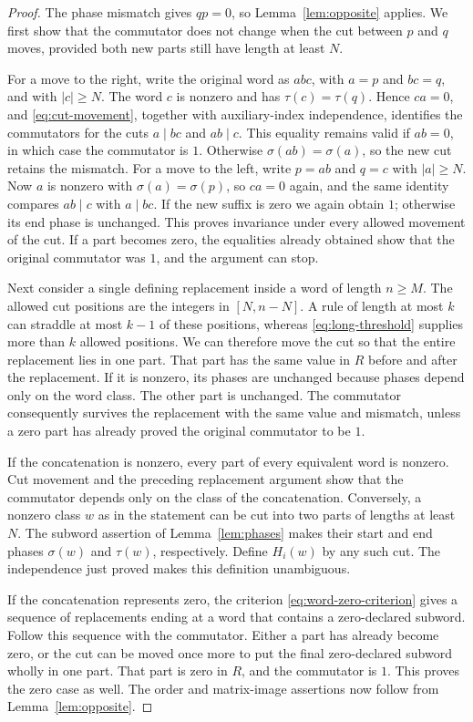 \begin{proof}
The phase mismatch gives $qp=0$, so
Lemma~\ref{lem:opposite} applies. We first show that the commutator
does not change when the cut between $p$ and $q$ moves, provided both
new parts still have length at least $N$.

For a move to the right, write the original word as $abc$, with
$a=p$ and $bc=q$, and with $|c|\ge N$. The word $c$ is nonzero and
has $\tau(c)=\tau(q)$. Hence $ca=0$, and
\eqref{eq:cut-movement}, together with auxiliary-index independence,
identifies the commutators for the cuts $a\mid bc$ and $ab\mid c$.
This equality remains valid if $ab=0$, in which case the commutator
is $1$. Otherwise $\sigma(ab)=\sigma(a)$, so the new cut retains
the mismatch. For a move to the left, write $p=ab$ and $q=c$ with
$|a|\ge N$. Now $a$ is nonzero with $\sigma(a)=\sigma(p)$, so
$ca=0$ again, and the same identity compares $ab\mid c$ with
$a\mid bc$. If the new suffix is zero we again obtain $1$;
otherwise its end phase is unchanged. This proves invariance under
every allowed movement of the cut. If a part becomes zero, the
equalities already obtained show that the original commutator was
$1$, and the argument can stop.

Next consider a single defining replacement inside a word of length
$n\ge M$. The allowed cut positions are the integers in $[N,n-N]$.
A rule of length at most $k$ can straddle at most $k-1$ of these
positions, whereas \eqref{eq:long-threshold} supplies more than $k$
allowed positions. We can therefore move the cut so that the entire
replacement lies in one part. That part has the same value in $R$
before and after the replacement. If it is nonzero, its phases are
unchanged because phases depend only on the word class. The other
part is unchanged. The commutator consequently survives the
replacement with the same value and mismatch, unless a zero part has
already proved the original commutator to be $1$.

If the concatenation is nonzero, every part of every equivalent word
is nonzero. Cut movement and the preceding replacement argument show
that the commutator depends only on the class of the concatenation.
Conversely, a nonzero class $w$ as in the statement can be cut into
two parts of lengths at least $N$. The subword assertion of
Lemma~\ref{lem:phases} makes their start and end phases
$\sigma(w)$ and $\tau(w)$, respectively. Define $H_i(w)$ by any
such cut. The independence just proved makes this definition
unambiguous.

If the concatenation represents zero, the criterion
\eqref{eq:word-zero-criterion} gives a sequence of replacements
ending at a word that contains a zero-declared subword. Follow this
sequence with the commutator. Either a part has already become zero,
or the cut can be moved once more to put the final zero-declared
subword wholly in one part. That part is zero in $R$, and the
commutator is $1$. This proves the zero case as well. The order and
matrix-image assertions now follow from
Lemma~\ref{lem:opposite}.
\end{proof}

